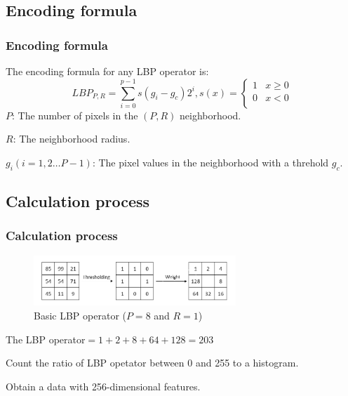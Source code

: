 \documentclass[notheorems, serif, table, compress]{beamer}  %
\begin{document}
\subsection{Encoding formula}
\begin{frame}[fragile]
\frametitle{Encoding formula}
The encoding formula for any LBP operator is: 
\begin{equation}
LBP_{P,R}=\sum_{i=0}^{p-1}s(g_{i}-g_{c})2^{i}, s(x)= \left\{ \begin{array}{ll}
1 & \textrm{$x\geq0$}\\
0 & \textrm{$x<0$}\\
\end{array} \right.
\end{equation}
$P$: The number of pixels in the $(P,R)$ neighborhood.
 
$R$: The neighborhood radius.

$g_{i}$$(i=1,2 \ldots P-1)$: The pixel values in the neighborhood with a threhold $g_{c}$.
\end{frame}

\subsection{Calculation process}
\begin{frame}[fragile]
\frametitle{Calculation process}


\begin{figure}[!ht]
  \centering\includegraphics[width=3in]{lbp.png}
  \caption{Basic LBP operator ($P=8$ and $R=1$)}
 \label{3}
  \end{figure}

The LBP operator$=1+2+8+64+128=203$

Count the ratio of LBP opetator between 0 and 255 to a histogram.

Obtain a data with 256-dimensional features.
\end{frame}
\end{document}
